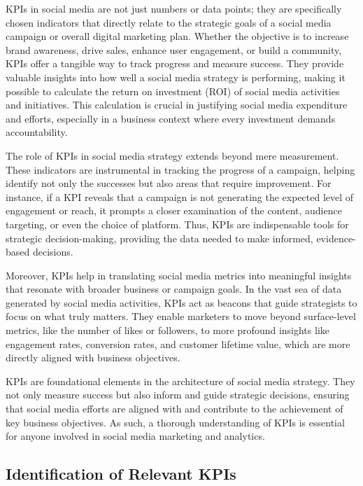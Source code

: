 \documentclass[
]{book}
\begin{document}
KPIs in social media are not just numbers or data points; they are specifically chosen indicators that directly relate to the strategic goals of a social media campaign or overall digital marketing plan. Whether the objective is to increase brand awareness, drive sales, enhance user engagement, or build a community, KPIs offer a tangible way to track progress and measure success. They provide valuable insights into how well a social media strategy is performing, making it possible to calculate the return on investment (ROI) of social media activities and initiatives. This calculation is crucial in justifying social media expenditure and efforts, especially in a business context where every investment demands accountability.

The role of KPIs in social media strategy extends beyond mere measurement. These indicators are instrumental in tracking the progress of a campaign, helping identify not only the successes but also areas that require improvement. For instance, if a KPI reveals that a campaign is not generating the expected level of engagement or reach, it prompts a closer examination of the content, audience targeting, or even the choice of platform. Thus, KPIs are indispensable tools for strategic decision-making, providing the data needed to make informed, evidence-based decisions.

Moreover, KPIs help in translating social media metrics into meaningful insights that resonate with broader business or campaign goals. In the vast sea of data generated by social media activities, KPIs act as beacons that guide strategists to focus on what truly matters. They enable marketers to move beyond surface-level metrics, like the number of likes or followers, to more profound insights like engagement rates, conversion rates, and customer lifetime value, which are more directly aligned with business objectives.

KPIs are foundational elements in the architecture of social media strategy. They not only measure success but also inform and guide strategic decisions, ensuring that social media efforts are aligned with and contribute to the achievement of key business objectives. As such, a thorough understanding of KPIs is essential for anyone involved in social media marketing and analytics.

\hypertarget{identification-of-relevant-kpis}{%
\subsection*{Identification of Relevant KPIs}\label{identification-of-relevant-kpis}}
\end{document}
